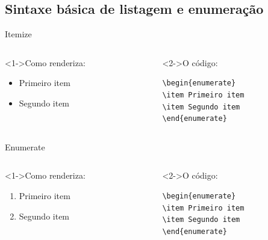 \documentclass[bigger]{beamer}
\begin{document}
\subsection{Sintaxe básica de listagem e enumeração}
\label{sec:org1ad3d4b}
\begin{frame}[label={sec:org98faf70},fragile]{Itemize}
 \begin{columns}
\begin{column}{0.48\columnwidth}
\begin{block}<1->{Como renderiza:}
\begin{itemize}
\item Primeiro item
\item Segundo item
\end{itemize}
\end{block}
\end{column}

\begin{column}{0.48\columnwidth}
\begin{block}<2->{O código:}
\begin{verbatim}
\begin{enumerate}
\item Primeiro item
\item Segundo item
\end{enumerate}
\end{verbatim}
\end{block}
\end{column}
\end{columns}
\end{frame}


\begin{frame}[label={sec:org5116f10},fragile]{Enumerate}
 \begin{columns}
\begin{column}{0.48\columnwidth}
\begin{block}<1->{Como renderiza:}
\begin{enumerate}
\item Primeiro item
\item Segundo item
\end{enumerate}
\end{block}
\end{column}
\begin{column}{0.48\columnwidth}
\begin{block}<2->{O código:}
\begin{verbatim}
\begin{enumerate}
\item Primeiro item
\item Segundo item
\end{enumerate}
\end{verbatim}
\end{block}
\end{column}
\end{columns}
\end{frame}
\end{document}
